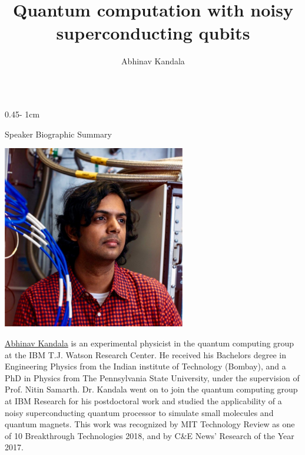 \documentclass{../psuposter}
\title{Quantum computation with noisy superconducting qubits}
\author{Abhinav Kandala \inst{1}}
\institute{\inst{1} IBM T.J. Watson Research Center}
\begin{document}
\begin{frame}
\begin{columns}[t, totalwidth=\textwidth]
\begin{column}{0.45\textwidth - 1cm}


    \begin{block}{Speaker Biographic Summary}
    	\begin{center}
    		\includegraphics[width=0.6\textwidth]{images/kandala}
    	\end{center}
    	\href{}{Abhinav Kandala} is an experimental physicist in the quantum computing group at the IBM T.J. Watson Research Center. He received his Bachelors degree in Engineering Physics from the Indian institute of Technology (Bombay), and a PhD in Physics from The Pennsylvania State University, under the supervision of Prof. Nitin Samarth. Dr. Kandala went on to join the quantum computing group at IBM Research for his postdoctoral work and studied the applicability of a noisy superconducting quantum processor to simulate small molecules and quantum magnets. This work was recognized by MIT Technology Review as one of 10 Breakthrough Technologies 2018, and by C\&E News’ Research of the Year 2017. \cite{Kandala}
    \end{block}



\end{column}
\end{columns}
\end{frame}
\end{document}
